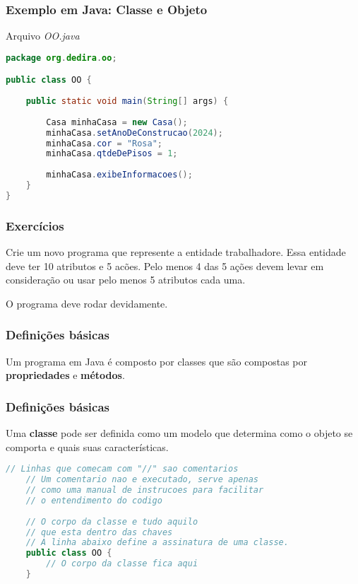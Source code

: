 \begin{frame}[fragile]
	\frametitle{Exemplo em Java: Classe e Objeto}
	\par Arquivo \textit{OO.java}
	\begin{lstlisting}[language=Java]
package org.dedira.oo;

public class OO {
	
	public static void main(String[] args) {
		
		Casa minhaCasa = new Casa();
		minhaCasa.setAnoDeConstrucao(2024);
		minhaCasa.cor = "Rosa";
		minhaCasa.qtdeDePisos = 1;
		
		minhaCasa.exibeInformacoes();
	}
}
	\end{lstlisting}
\end{frame}

\begin{frame}
	\frametitle{Exercícios}
	\par Crie um novo programa que represente a entidade trabalhadore. Essa entidade deve ter 10 atributos e 5 acões. Pelo menos 4 das 5 ações devem levar em consideração ou usar pelo menos 5 atributos cada uma.
	
	\par O programa deve rodar devidamente.
\end{frame}

\begin{frame}[fragile]
	\frametitle{Definições básicas}
	
	\par Um programa em Java é composto por classes que são compostas por \textbf{propriedades} e \textbf{métodos}.

\end{frame}

\begin{frame}[fragile]
\frametitle{Definições básicas}
	
	\par Uma \textbf{classe} pode ser definida como um modelo que determina como o objeto se comporta e quais suas características.
	\begin{lstlisting}[language=Java]
	// Linhas que comecam com "//" sao comentarios
	// Um comentario nao e executado, serve apenas 
	// como uma manual de instrucoes para facilitar
	// o entendimento do codigo
	
	// O corpo da classe e tudo aquilo 
	// que esta dentro das chaves
	// A linha abaixo define a assinatura de uma classe. 
	public class OO {
		// O corpo da classe fica aqui	
	}
	\end{lstlisting}

\end{frame}

